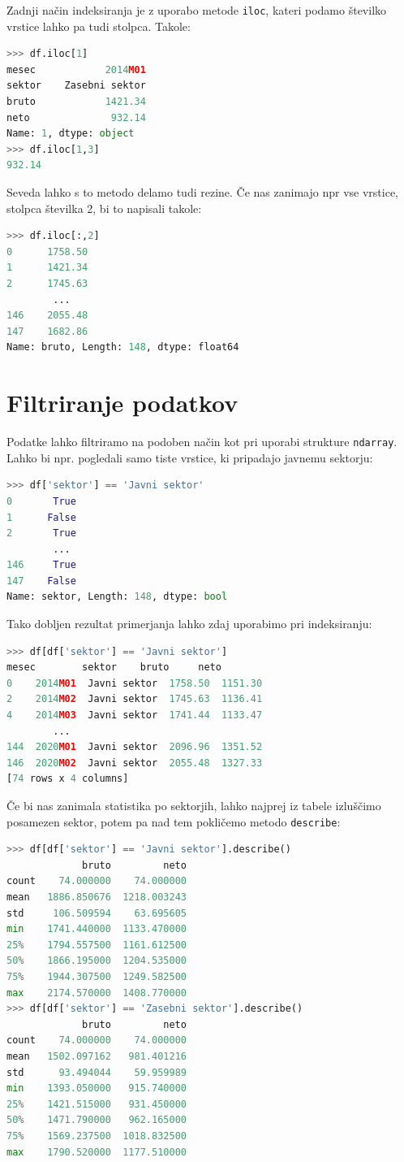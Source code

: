 Zadnji način indeksiranja je z uporabo metode \texttt{iloc}, kateri podamo številko vrstice lahko pa tudi stolpca. Takole:
\begin{lstlisting}[language=python]
>>> df.iloc[1]
mesec            2014M01
sektor    Zasebni sektor
bruto            1421.34
neto              932.14
Name: 1, dtype: object
>>> df.iloc[1,3]
932.14
\end{lstlisting}
Seveda lahko s to metodo delamo tudi rezine. Če nas zanimajo npr vse vrstice, stolpca številka 2, bi to napisali takole:
\begin{lstlisting}[language=python]
>>> df.iloc[:,2]
0      1758.50
1      1421.34
2      1745.63
        ...
146    2055.48
147    1682.86
Name: bruto, Length: 148, dtype: float64
\end{lstlisting}

\section{Filtriranje podatkov}
Podatke lahko filtriramo na podoben način kot pri uporabi strukture \texttt{ndarray}. Lahko bi npr. pogledali samo tiste vrstice, ki pripadajo javnemu sektorju:
\begin{lstlisting}[language=python]
>>> df['sektor'] == 'Javni sektor'
0       True
1      False
2       True
        ...
146     True
147    False
Name: sektor, Length: 148, dtype: bool
\end{lstlisting}
Tako dobljen rezultat primerjanja lahko zdaj uporabimo pri indeksiranju:
\begin{lstlisting}[language=python]
>>> df[df['sektor'] == 'Javni sektor']
mesec        sektor    bruto     neto
0    2014M01  Javni sektor  1758.50  1151.30
2    2014M02  Javni sektor  1745.63  1136.41
4    2014M03  Javni sektor  1741.44  1133.47
        ...
144  2020M01  Javni sektor  2096.96  1351.52
146  2020M02  Javni sektor  2055.48  1327.33
[74 rows x 4 columns]
\end{lstlisting}
Če bi nas zanimala statistika po sektorjih, lahko najprej iz tabele izluščimo posamezen sektor, potem pa nad tem pokličemo metodo \texttt{describe}:
\begin{lstlisting}[language=python]
>>> df[df['sektor'] == 'Javni sektor'].describe()
             bruto         neto
count    74.000000    74.000000
mean   1886.850676  1218.003243
std     106.509594    63.695605
min    1741.440000  1133.470000
25%    1794.557500  1161.612500
50%    1866.195000  1204.535000
75%    1944.307500  1249.582500
max    2174.570000  1408.770000
>>> df[df['sektor'] == 'Zasebni sektor'].describe()
             bruto         neto
count    74.000000    74.000000
mean   1502.097162   981.401216
std      93.494044    59.959989
min    1393.050000   915.740000
25%    1421.515000   931.450000
50%    1471.790000   962.165000
75%    1569.237500  1018.832500
max    1790.520000  1177.510000
\end{lstlisting}

